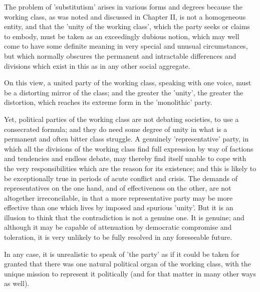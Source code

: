 The problem of 'substitutism' arises in various forms and degrees because the working class, as was noted and discussed in Chapter II, is not a homogeneous entity, and that the 'unity of the working class', which the party seeks or claims to embody, must be taken as an exceedingly dubious notion, which may well come to have some definite meaning in very special and unusual circumstances, but which normally obscures the permanent and intractable differences and divisions which exist in this as in any other social aggregate.

On this view, a united party of the working class, speaking with one voice, must be a distorting mirror of the class; and the greater the 'unity', the greater the distortion, which reaches its extreme form in the 'monolithic' party.

Yet, political parties of the working class are not debating societies, to use a consecrated formula; and they do need some degree of unity in what is a permanent and often bitter class struggle. A genuinely 'representative' party, in which all the divisions of the working class find full expression by way of factions and tendencies and endless debate, may thereby find itself unable to cope with the very responsibilities which are the reason for its existence; and this is likely to be exceptionally true in periods of acute conflict and crisis. The demands of representatives on the one hand, and of effectiveness on the other, are not altogether irreconcilable, in that a more representative party may be more effective than one which lives by imposed and spurious 'unity'. But it is an illusion to think that the contradiction is not a genuine one. It is genuine; and although it may be capable of attenuation by democratic compromise and toleration, it is very unlikely to be fully resolved in any foreseeable future.

In any case, it is unrealistic to speak of 'the party' as if it could be taken for granted that there was one natural political organ of the working class, with the unique mission to represent it politically (and for that matter in many other ways as well).

